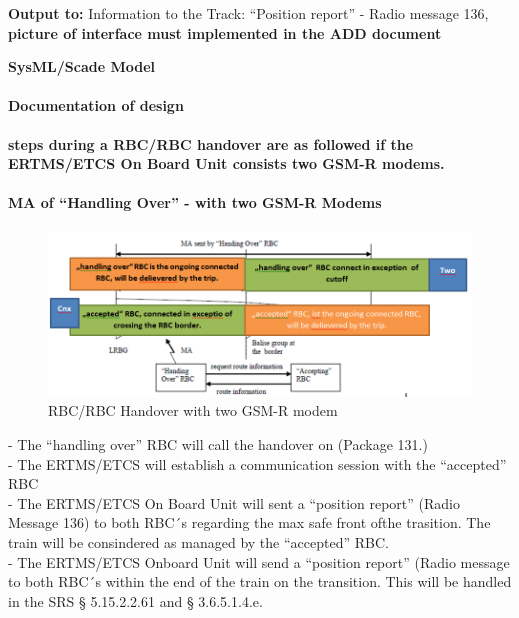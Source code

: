 \documentclass{template/openetcs_report}
\begin{document}
\textbf{Output to:} Information to the Track: ``Position report'' - Radio message 136, \\

\textbf{picture of interface must implemented in the ADD document}

\textbf{SysML/Scade Model}

\paragraph{Documentation of design}
\textbf{ steps during a RBC/RBC handover are as followed if the ERTMS/ETCS On Board Unit consists two GSM-R modems.}\\

\paragraph{MA of ``Handling Over'' - with two GSM-R Modems}
\begin{figure}[hbtp]
\centering
\includegraphics [scale=0.5]{images/Handingover}
\caption{RBC/RBC Handover with two GSM-R modem}
\end{figure}
\newpage

- The ``handling over'' RBC will call the handover on (Package 131.)\\

- The ERTMS/ETCS will establish a communication session with the ``accepted'' RBC\\

- The ERTMS/ETCS On Board Unit will sent a ``position report'' (Radio Message 136) to both RBC´s regarding the max safe front ofthe trasition. The train will be consindered as managed by the ``accepted'' RBC.\\

- The ERTMS/ETCS Onboard Unit will send a ``position report'' (Radio message to both RBC´s within the end of the train on the transition. This will be handled in the SRS § 5.15.2.2.61 and § 3.6.5.1.4.e.\\
\end{document}
